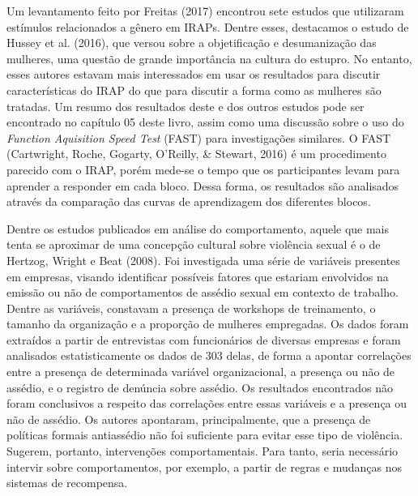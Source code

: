 Um levantamento feito por Freitas (2017) encontrou sete estudos que utilizaram estímulos relacionados a gênero em IRAPs. Dentre esses, destacamos o estudo de Hussey et al. (2016), que versou sobre a objetificação e desumanização das mulheres, uma questão de grande importância na cultura do estupro. No entanto, esses autores estavam mais interessados em usar os resultados para discutir características do IRAP do que para discutir a forma como as mulheres são tratadas. Um resumo dos resultados deste e dos outros estudos pode ser encontrado no capítulo 05 deste livro, assim como uma discussão sobre o uso do \textit{Function Aquisition Speed Test} (FAST) para investigações similares. O FAST (Cartwright, Roche, Gogarty, O'Reilly, \& Stewart, 2016) é um procedimento parecido com o IRAP, porém mede-se o tempo que os participantes levam para aprender a responder em cada bloco. Dessa forma, os resultados são analisados através da comparação das curvas de aprendizagem dos diferentes blocos.

Dentre os estudos publicados em análise do comportamento, aque\-le que mais tenta se aproximar de uma concepção cultural sobre violência sexual é o de Hertzog, Wright e Beat (2008). Foi investigada uma série de variáveis presentes em empresas, visando identificar possíveis fatores que estariam envolvidos na emissão ou não de comportamentos de assédio sexual em contexto de trabalho. Dentre as variáveis, constavam a presença de workshops de treinamento, o tamanho da organização e a proporção de mulheres empregadas. Os dados foram extraídos a partir de entrevistas com funcionários de diversas empresas e foram analisados estatisticamente os dados de 303 delas, de forma a apontar correlações entre a presença de determinada variável organizacional, a presença ou não de assédio, e o registro de denúncia sobre assédio. Os resultados encontrados não foram conclusivos a respeito das correlações entre essas variáveis e a presença ou não de assédio. Os autores apontaram, principalmente, que a presença de políticas formais antiassédio não foi suficiente para evitar esse tipo de violência. Sugerem, portanto, intervenções comportamentais. Para tanto, seria necessário intervir sobre comportamentos, por exemplo, a partir de regras e mudanças nos sistemas de recompensa.

